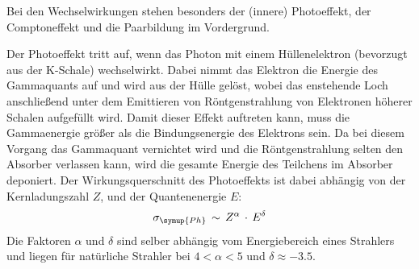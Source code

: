     Bei den Wechselwirkungen stehen besonders der (innere) Photoeffekt, der Comptoneffekt und
    die Paarbildung im Vordergrund.

    Der Photoeffekt tritt auf, wenn das Photon mit einem Hüllenelektron (bevorzugt aus
    der K-Schale) wechselwirkt. Dabei nimmt das Elektron die Energie des Gammaquants auf und wird aus der
    Hülle gelöst, wobei das enstehende Loch anschließend unter dem Emittieren von Röntgenstrahlung von Elektronen höherer Schalen aufgefüllt wird.
    Damit dieser Effekt auftreten kann, muss die Gammaenergie größer als die Bindungsenergie des Elektrons sein.
    Da bei diesem Vorgang das Gammaquant vernichtet wird und die Röntgenstrahlung selten den Absorber verlassen kann,
    wird die gesamte Energie des Teilchens im Absorber deponiert. Der Wirkungsquerschnitt des Photoeffekts ist dabei
    abhängig von der Kernladungszahl $Z$, und der Quantenenergie $E$:
    \begin{align}
      \sigma_{\symup{Ph}}\,\sim\,Z^{\alpha}\,\cdot\,E^{\delta}\\
    \end{align}
    Die Faktoren $\alpha$ und $\delta$ sind selber abhängig vom Energiebereich eines Strahlers und liegen für
    natürliche Strahler bei $4 < \alpha < 5$ und $\delta \approx -3.5$.


